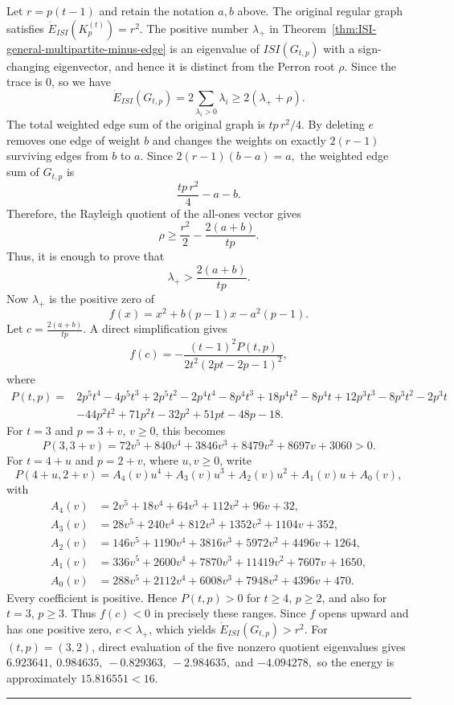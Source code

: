 \documentclass[12pt,twoside]{article}
\renewenvironment{proof}{{\noindent\bfseries Proof.}}{\qed}
\def\qed{\nolinebreak\hfill\rule{.2cm}{.2cm}\par\addvspace{.5cm}}
\begin{document}
\begin{proof}
	Let $r=p(t-1)$ and retain the notation $a,b$ above. The original regular graph satisfies
	$
	\dot E_{ISI}(K_p^{(t)})=r^2.
	$
	The positive number $\lambda_+$ in Theorem~\ref{thm:ISI-general-multipartite-minus-edge} is an eigenvalue of $ISI(G_{t,p})$ with a sign-changing eigenvector, and hence it is distinct from the Perron root $\rho$. Since the trace is $0$, so we have
	$$
	\dot E_{ISI}(G_{t,p})
	=2\sum_{\lambda_i>0}\lambda_i
	\geq2(\lambda_++\rho).
	$$
	The total weighted edge sum of the original graph is $tp\,r^2/4$. By deleting $e$ removes one edge of weight $b$ and changes the weights on exactly $2(r-1)$ surviving edges from $b$ to $a$. Since
	$
	2(r-1)(b-a)=a,
	$
	the weighted edge sum of $G_{t,p}$ is
	$$
	\frac{tp\,r^2}{4}-a-b.
	$$
	Therefore, the Rayleigh quotient of the all-ones vector gives
	$$
	\rho\geq\frac{r^2}{2}-\frac{2(a+b)}{tp}.
	$$
	Thus, it is enough to prove that
	$$
	\lambda_+>\frac{2(a+b)}{tp}.
	$$
	Now $\lambda_+$ is the positive zero of
	$$
	f(x)=x^2+b(p-1)x-a^2(p-1).
	$$
	Let
	$
	c=\tfrac{2(a+b)}{tp}.
	$
	A direct simplification gives
	$$
	f(c)
	=-\frac{(t-1)^2P(t,p)}{2t^2(2pt-2p-1)^2},
	$$
	where
	$$
	\begin{aligned}
		P(t,p)={}&2p^5t^4-4p^5t^3+2p^5t^2-2p^4t^4-8p^4t^3+18p^4t^2-8p^4t+12p^3t^3-8p^3t^2-2p^3t\\
		&-44p^2t^2+71p^2t-32p^2+51pt-48p-18.
	\end{aligned}
	$$
	For $t=3$ and $p=3+v$, $v\geq0$, this becomes
	$$
	P(3,3+v)
	=72v^5+840v^4+3846v^3+8479v^2+8697v+3060>0.
	$$
	For $t=4+u$ and $p=2+v$, where $u,v\geq0$, write
	$$
	P(4+u,2+v)=A_4(v)u^4+A_3(v)u^3+A_2(v)u^2+A_1(v)u+A_0(v),
	$$
	with
	$$
	\begin{aligned}
		A_4(v)&=2v^5+18v^4+64v^3+112v^2+96v+32,\\
		A_3(v)&=28v^5+240v^4+812v^3+1352v^2+1104v+352,\\
		A_2(v)&=146v^5+1190v^4+3816v^3+5972v^2+4496v+1264,\\
		A_1(v)&=336v^5+2600v^4+7870v^3+11419v^2+7607v+1650,\\
		A_0(v)&=288v^5+2112v^4+6008v^3+7948v^2+4396v+470.
	\end{aligned}
	$$
	Every coefficient is positive. Hence $P(t,p)>0$ for $t\geq4$, $p\geq2$, and also for $t=3$, $p\geq3$. Thus $f(c)<0$ in precisely these ranges. Since $f$ opens upward and has one positive zero, $c<\lambda_+$, which yields
	$
	\dot E_{ISI}(G_{t,p})>r^2.
	$
	For $(t,p)=(3,2)$, direct evaluation of the five nonzero quotient eigenvalues gives
	$
	6.923641,~0.984635,~-0.829363,~-2.984635,$ and $-4.094278,
	$
	so the energy is approximately $15.816551<16$.
\end{proof}
\end{document}
